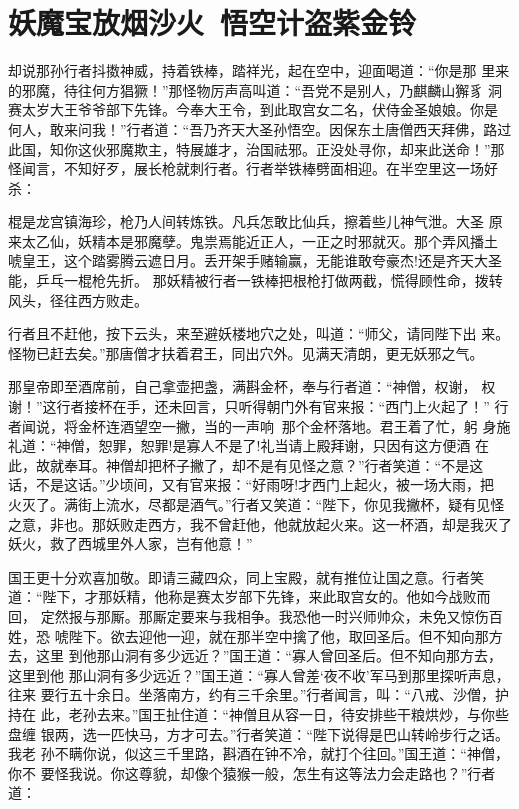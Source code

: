 \chapter{妖魔宝放烟沙火~悟空计盗紫金铃}

却说那孙行者抖擞神威，持着铁棒，踏祥光，起在空中，迎面喝道：“你是那
里来的邪魔，待往何方猖獗！”那怪物厉声高叫道：“吾党不是别人，乃麒麟山獬豸
洞赛太岁大王爷爷部下先锋。今奉大王令，到此取宫女二名，伏侍金圣娘娘。你是
何人，敢来问我！”行者道：“吾乃齐天大圣孙悟空。因保东土唐僧西天拜佛，路过
此国，知你这伙邪魔欺主，特展雄才，治国祛邪。正没处寻你，却来此送命！”那
怪闻言，不知好歹，展长枪就刺行者。行者举铁棒劈面相迎。在半空里这一场好杀：

棍是龙宫镇海珍，枪乃人间转炼铁。凡兵怎敢比仙兵，擦着些儿神气泄。大圣
原来太乙仙，妖精本是邪魔孽。鬼祟焉能近正人，一正之时邪就灭。那个弄风播土
唬皇王，这个踏雾腾云遮日月。丢开架手赌输赢，无能谁敢夸豪杰!还是齐天大圣
能，乒乓一棍枪先折。
那妖精被行者一铁棒把根枪打做两截，慌得顾性命，拨转风头，径往西方败走。

行者且不赶他，按下云头，来至避妖楼地穴之处，叫道：“师父，请同陛下出
来。怪物已赶去矣。”那唐僧才扶着君王，同出穴外。见满天清朗，更无妖邪之气。

那皇帝即至酒席前，自己拿壶把盏，满斟金杯，奉与行者道：“神僧，权谢，
权谢！”这行者接杯在手，还未回言，只听得朝门外有官来报：“西门上火起了！”
行者闻说，将金杯连酒望空一撇，当的一声响，那个金杯落地。君王着了忙，躬
身施礼道：“神僧，恕罪，恕罪!是寡人不是了!礼当请上殿拜谢，只因有这方便酒
在此，故就奉耳。神僧却把杯子撇了，却不是有见怪之意？”行者笑道：“不是这
话，不是这话。”少顷间，又有官来报：“好雨呀!才西门上起火，被一场大雨，把
火灭了。满街上流水，尽都是酒气。”行者又笑道：“陛下，你见我撇杯，疑有见怪
之意，非也。那妖败走西方，我不曾赶他，他就放起火来。这一杯酒，却是我灭了
妖火，救了西城里外人家，岂有他意！”

国王更十分欢喜加敬。即请三藏四众，同上宝殿，就有推位让国之意。行者笑
道：“陛下，才那妖精，他称是赛太岁部下先锋，来此取宫女的。他如今战败而回，
定然报与那厮。那厮定要来与我相争。我恐他一时兴师帅众，未免又惊伤百姓，恐
唬陛下。欲去迎他一迎，就在那半空中擒了他，取回圣后。但不知向那方去，这里
到他那山洞有多少远近？”国王道：“寡人曾回圣后。但不知向那方去，这里到他
那山洞有多少远近？”国王道：“寡人曾差‘夜不收’军马到那里探听声息，往来
要行五十余日。坐落南方，约有三千余里。”行者闻言，叫：“八戒、沙僧，护持在
此，老孙去来。”国王扯住道：“神僧且从容一日，待安排些干粮烘炒，与你些盘缠
银两，选一匹快马，方才可去。”行者笑道：“陛下说得是巴山转岭步行之话。我老
孙不瞒你说，似这三千里路，斟酒在钟不冷，就打个往回。”国王道：“神僧，你不
要怪我说。你这尊貌，却像个猿猴一般，怎生有这等法力会走路也？”行者道：

